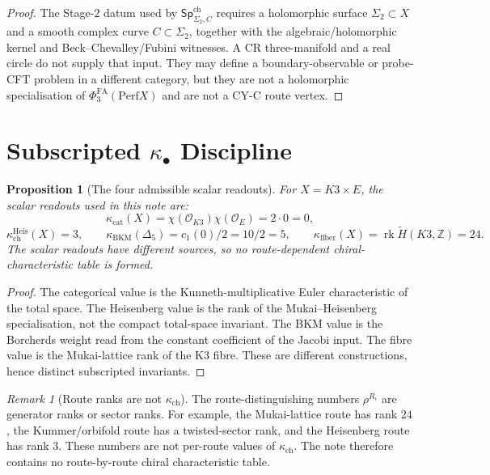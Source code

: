 \documentclass[11pt]{amsart}
\theoremstyle{plain}
\newtheorem{proposition}[theorem]{Proposition}
\theoremstyle{definition}
\theoremstyle{remark}
\newtheorem{remark}[theorem]{Remark}
\providecommand{\Z}{\mathbb{Z}}
\providecommand{\Perf}{\mathrm{Perf}}
\providecommand{\PhiFA}{\Phi^{\mathrm{FA}}}
\providecommand{\SpCh}{\mathsf{Sp}^{\mathrm{ch}}}
\providecommand{\kcat}{\kappa_{\mathrm{cat}}}
\providecommand{\kch}{\kappa_{\mathrm{ch}}}
\providecommand{\kBKM}{\kappa_{\mathrm{BKM}}}
\providecommand{\kfib}{\kappa_{\mathrm{fiber}}}
\providecommand{\rhoR}{\rho}
\providecommand{\Delt}{\Delta_{5}}
\begin{document}
\begin{proof}
The Stage-$2$ datum used by $\SpCh_{\Sigma_2,C}$ requires a holomorphic
surface $\Sigma_2\subset X$ and a smooth complex curve $C\subset
\Sigma_2$, together with the algebraic/holomorphic kernel and
Beck--Chevalley/Fubini witnesses.  A CR three-manifold and a real
circle do not supply that input.  They may define a boundary-observable
or probe-CFT problem in a different category, but they are not a
holomorphic specialisation of $\PhiFA_3(\Perf X)$ and are not a CY-C
route vertex.
\end{proof}

\section{Subscripted \texorpdfstring{$\kappa_\bullet$}{kappa} Discipline}
\label{sec:kappa-discipline}

\begin{proposition}[The four admissible scalar readouts]
\label{prop:four-kappa-readouts}
For $X=K3\times E$, the scalar readouts used in this note are:
\[
 \kcat(X)=\chi(\mathcal O_{K3})\chi(\mathcal O_E)=2\cdot 0=0,
\]
\[
 \kch^{\mathrm{Heis}}(X)=3,\qquad
 \kBKM(\Delt)=c_1(0)/2=10/2=5,\qquad
 \kfib(X)=\operatorname{rk}\widetilde H(K3,\Z)=24.
\]
The scalar readouts have different sources, so no route-dependent
chiral-characteristic table is formed.
\end{proposition}

\begin{proof}
The categorical value is the Kunneth-multiplicative Euler characteristic
of the total space.  The Heisenberg value is the rank of the
Mukai--Heisenberg specialisation, not the compact total-space invariant.
The BKM value is the Borcherds weight read from the constant coefficient
of the Jacobi input.  The fibre value is the Mukai-lattice rank of the
K3 fibre.  These are different constructions, hence distinct
subscripted invariants.
\end{proof}

\begin{remark}[Route ranks are not \texorpdfstring{$\kappa_{\mathrm{ch}}$}{kappa-ch}]
\label{rem:rho-not-kappa}
The route-distinguishing numbers $\rhoR^{R_i}$ are generator ranks or
sector ranks.  For example, the Mukai-lattice route has rank $24$, the
Kummer/orbifold route has a twisted-sector rank, and the Heisenberg
route has rank $3$.  These numbers are not per-route values of
$\kch$.  The note therefore contains no route-by-route chiral
characteristic table.
\end{remark}
\end{document}
